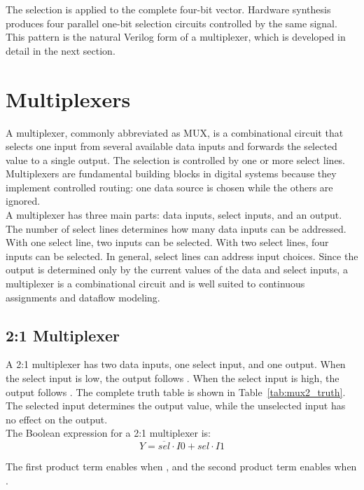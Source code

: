 \noindent The selection is applied to the complete four-bit vector. Hardware synthesis produces four
parallel one-bit selection circuits controlled by the same  signal. This pattern is
the natural Verilog form of a multiplexer, which is developed in detail in the next section.

\section{Multiplexers}
A multiplexer, commonly abbreviated as MUX, is a combinational circuit that selects one input from
several available data inputs and forwards the selected value to a single output. The selection is
controlled by one or more select lines. Multiplexers are fundamental building blocks in digital
systems because they implement controlled routing: one data source is chosen while the others are
ignored.\\

\noindent A multiplexer has three main parts: data inputs, select inputs, and an output. The number
of select lines determines how many data inputs can be addressed. With one select line, two inputs
can be selected. With two select lines, four inputs can be selected. In general, 
select lines can address  input choices. Since the output is determined only by the
current values of the data and select inputs, a multiplexer is a combinational circuit and is well
suited to continuous assignments and dataflow modeling.

\subsection{2:1 Multiplexer}
A 2:1 multiplexer has two data inputs, one select input, and one output. When the select input is
low, the output follows . When the select input is high, the output follows
. The complete truth table is shown in Table~\ref{tab:mux2_truth}. The selected
input determines the output value, while the unselected input has no effect on the output.\\

\noindent The Boolean expression for a 2:1 multiplexer is:
\[
Y = \overline{sel}\cdot I0 + sel\cdot I1
\]

\noindent The first product term enables  when , and the second
product term enables  when .

